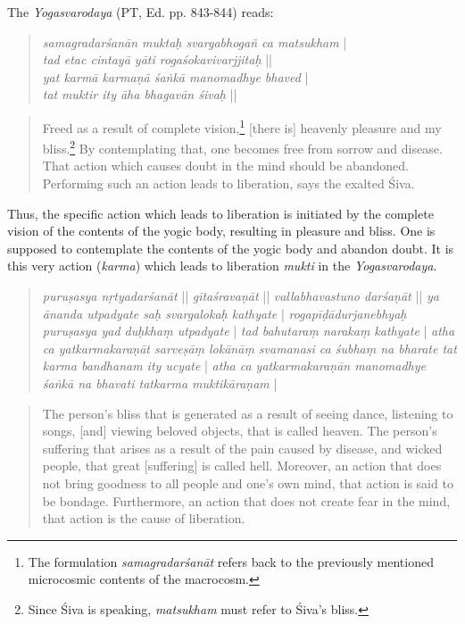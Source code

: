 The \textit{Yogasvarodaya} (PT, Ed. pp. 843-844) reads:

\begin{ekdosis}
\begin{quote}
  \textit{samagradarśanān muktaḥ svargabhogañ ca matsukham} | \\
  \textit{tad etac cintayā yāti rogaśokavivarjjitaḥ} ||\\
  \textit{yat karmā karmaṇā śaṅkā manomadhye bhaved } |\\
  \textit{tat } \textit{muktir ity āha bhagavān śivaḥ} ||
\end{quote}
\end{ekdosis}

\begin{quote}
Freed as a result of complete vision,\footnote{The formulation \textit{samagradarśanāt} refers back to the previously mentioned microcosmic contents of the macrocosm.} [there is] heavenly pleasure and my bliss.\footnote{Since Śiva is speaking, \textit{matsukham} must refer to Śiva's bliss.} By contemplating that, one becomes free from sorrow and disease. That action which causes doubt in the mind should be abandoned. Performing such an action leads to liberation, says the exalted Śiva.
\end{quote}

Thus, the specific action which leads to liberation is initiated by the complete vision of the contents of the yogic body, resulting in pleasure and bliss. One is supposed to contemplate the contents of the yogic body and abandon doubt. It is this very action (\textit{karma}) which leads to liberation \textit{mukti} in the \emph{Yogasvarodaya}.   

\begin{quote}
  \textit{puruṣasya nṛtyadarśanāt} || \textit{gītaśravaṇāt} || \textit{vallabhavastuno darśaṇāt} || \textit{ya ānanda utpadyate saḥ svargalokaḥ kathyate} | \textit{rogapīḍādurjanebhyaḥ puruṣasya yad duḥkhaṃ utpadyate} | \textit{tad bahutaraṃ narakaṃ kathyate} | \textit{atha ca yatkarmakaraṇāt sarveṣāṃ lokānāṃ svamanasi ca śubhaṃ na bharate tat karma bandhanam ity ucyate} | \textit{atha ca yatkarmakaraṇān manomadhye śaṅkā na bhavati tatkarma muktikāraṇam} | 
\end{quote}
\begin{quote}
The person's bliss that is generated as a result of seeing dance, listening to songs, [and] viewing beloved objects, that is called heaven. The person's suffering that arises as a result of the pain caused by disease, and wicked people, that great [suffering] is called hell. Moreover, an action that does not bring goodness to all people and one's own mind, that action is said to be bondage. Furthermore, an action that does not create fear in the mind, that action is the cause of liberation.
  \end{quote}

